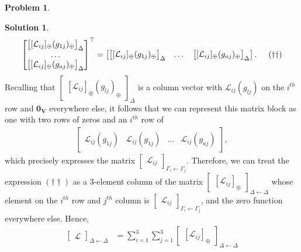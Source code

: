 \documentclass{book}
\theoremstyle{definition}
\newtheorem*{prob*}{Problem}
\newtheorem*{sln*}{Solution}
\newcommand{\V}{\mathbf{V}}
\newcommand{\lag}{\mathcal{L}}
\begin{document}
\begin{prob*}
\begin{sln*}
\begin{align*}
\begin{bmatrix}
\begin{bmatrix}
	[\lag_{ij}]_\oplus(g_{1j})_\oplus
	\end{bmatrix}_\Delta
	\\\dots\\
	\begin{bmatrix}
	[\lag_{ij}]_\oplus(g_{aj})_\oplus
	\end{bmatrix}_\Delta
	\end{bmatrix}^\top
	=
	\begin{bmatrix}
	\begin{bmatrix}
	[\lag_{ij}]_\oplus(g_{1j})_\oplus
	\end{bmatrix}_\Delta
	&\dots&
	\begin{bmatrix}
	[\lag_{ij}]_\oplus(g_{aj})_\oplus
	\end{bmatrix}_\Delta
	\end{bmatrix}. \hspace{0.5cm}(\dagger\dagger)
	\end{align*}
	Recalling that $\begin{bmatrix}[\lag_{ij}]_\oplus(g_{lj})_\oplus
	\end{bmatrix}_\Delta$ is a column vector with $\lag_{ij}(g_{lj})$ on the $i^{th}$ row and $\mathbf{0}_\V$ everywhere else, it follows that we can represent this matrix block as one with two rows of zeros and an $i^{th}$ row of 
	\begin{align*}
	\begin{bmatrix}
	\lag_{ij}(g_{1j}) & \lag_{ij}(g_{1j}) & \dots & \lag_{ij}(g_{aj})
	\end{bmatrix},
	\end{align*}
	which precisely expresses the matrix $\begin{bmatrix}
	\lag_{ij}
	\end{bmatrix}_{\Gamma_i\leftarrow\Gamma_j}$. Therefore, we can treat the expression $(\dagger\dagger)$ as a 3-element column of the matrix $\begin{bmatrix}[\lag_{ij}]_\oplus\end{bmatrix}_{\Delta\leftarrow\Delta}$ whose element on the $i^{th}$ row and $j^{th}$ column is $\begin{bmatrix}
	\lag_{ij}
	\end{bmatrix}_{\Gamma_i\leftarrow\Gamma_j}$, and the zero function everywhere else. Hence,
	\begin{align*}
	\begin{bmatrix}
	\lag
	\end{bmatrix}_{\Delta\leftarrow\Delta} &= \sum^3_{i=1}\sum^3_{j=1}\begin{bmatrix}[\lag_{ij}]_\oplus\end{bmatrix}_{\Delta\leftarrow\Delta}\\

\end{align*}
\end{sln*}
\end{prob*}
\end{document}
